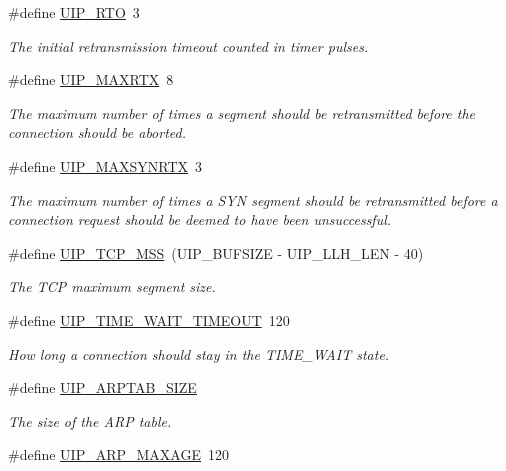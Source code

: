 \begin{CompactItemize}
\#define \hyperlink{a00074_g15de27b044603284f68db05a378235a7}{UIP\_\-RTO}~3
\begin{CompactList}\small\item\em The initial retransmission timeout counted in timer pulses. \item\end{CompactList}\item 
\#define \hyperlink{a00074_g67cf1e0d2324c93f332c1f020c0fe8b3}{UIP\_\-MAXRTX}~8
\begin{CompactList}\small\item\em The maximum number of times a segment should be retransmitted before the connection should be aborted. \item\end{CompactList}\item 
\#define \hyperlink{a00074_g24aa5bc36939cc9a0833e1df01478a7e}{UIP\_\-MAXSYNRTX}~3
\begin{CompactList}\small\item\em The maximum number of times a SYN segment should be retransmitted before a connection request should be deemed to have been unsuccessful. \item\end{CompactList}\item 
\#define \hyperlink{a00074_g4910467b83a639f06739c82cd362037e}{UIP\_\-TCP\_\-MSS}~(UIP\_\-BUFSIZE - UIP\_\-LLH\_\-LEN - 40)
\begin{CompactList}\small\item\em The TCP maximum segment size. \item\end{CompactList}\item 
\#define \hyperlink{a00074_g2bc3b489923793759526a3181eb667fa}{UIP\_\-TIME\_\-WAIT\_\-TIMEOUT}~120
\begin{CompactList}\small\item\em How long a connection should stay in the TIME\_\-WAIT state. \item\end{CompactList}\item 
\#define \hyperlink{a00075_gb1455b27c06532a399cf06d2c1d6d08d}{UIP\_\-ARPTAB\_\-SIZE}
\begin{CompactList}\small\item\em The size of the ARP table. \item\end{CompactList}\item 
\#define \hyperlink{a00075_g3090117ef3ff5775b77cb1960e442d07}{UIP\_\-ARP\_\-MAXAGE}~120

\end{CompactItemize}
